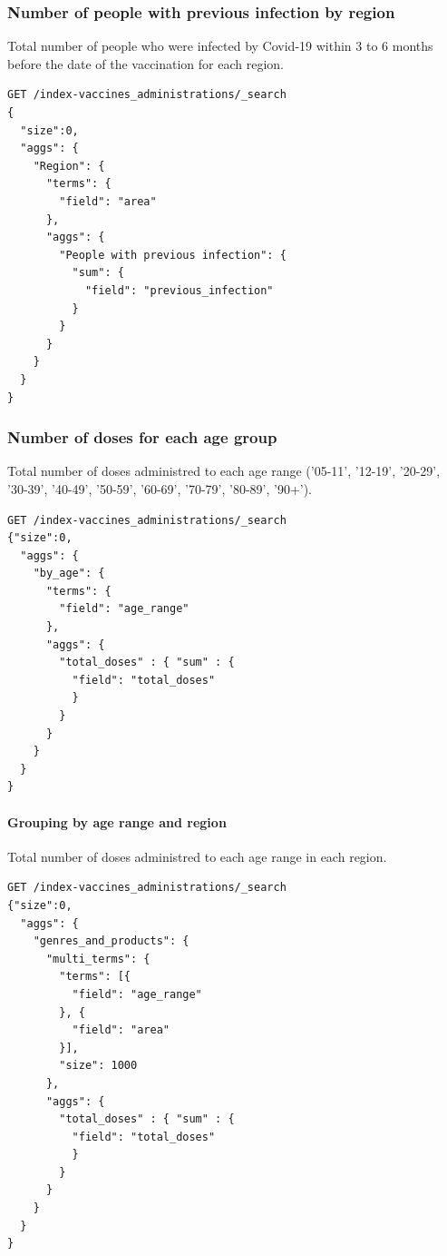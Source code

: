 \documentclass[12pt, a4paper]{article}
\begin{document}
\subsubsection{Number of people with previous infection by region}
Total number of people who were infected by Covid-19 within 3 to 6 months before the 
date of the vaccination for each region.
\begin{tcolorbox}[fontupper=\scriptsize]
  \begin{verbatim}
GET /index-vaccines_administrations/_search
{
  "size":0,
  "aggs": {
    "Region": {
      "terms": {
        "field": "area"
      },
      "aggs": {
        "People with previous infection": {
          "sum": {
            "field": "previous_infection"
          }
        }
      }
    }
  }
}
  \end{verbatim}
\end{tcolorbox}

\subsubsection{Number of doses for each age group}
Total number of doses administred to each age range ('05-11', '12-19', '20-29', '30-39',
'40-49', '50-59', '60-69', '70-79', '80-89', '90+').
\begin{tcolorbox}[fontupper=\scriptsize]
  \begin{verbatim}
GET /index-vaccines_administrations/_search
{"size":0,
  "aggs": {
    "by_age": {
      "terms": {
        "field": "age_range"
      },
      "aggs": {
        "total_doses" : { "sum" : { 
          "field": "total_doses"
          }
        }
      }
    }
  }
}
  \end{verbatim}
\end{tcolorbox}

\paragraph{Grouping by age range and region} \mbox{}

\vspace*{1em}

Total number of doses administred to each age range in each region.
\begin{tcolorbox}[fontupper=\scriptsize]
  \begin{verbatim}
GET /index-vaccines_administrations/_search
{"size":0,
  "aggs": {
    "genres_and_products": {
      "multi_terms": {
        "terms": [{
          "field": "age_range" 
        }, {
          "field": "area"
        }], 
        "size": 1000
      },
      "aggs": {
        "total_doses" : { "sum" : { 
          "field": "total_doses"
          } 
        }
      }
    }
  }
}
  \end{verbatim}
\end{tcolorbox}
\end{document}
